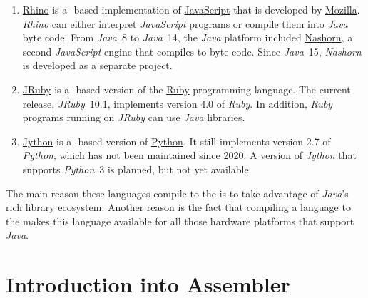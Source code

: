 \begin{enumerate}
      As of November 2026, \textsl{Clojure} occupies the $50^{\mathrm{th}}$ place in the
      \href{https://www.tiobe.com/tiobe-index/}{Tiobe index}.
\item \href{https://github.com/mozilla/rhino}{Rhino}
      is a -based implementation of
      \href{https://developer.mozilla.org/en-US/docs/Web/JavaScript}{JavaScript} that is developed by
      \href{https://www.mozilla.org}{Mozilla}.  \textsl{Rhino} can either interpret \textsl{JavaScript}
      programs or compile them into \textsl{Java} byte code.  From \textsl{Java}~8 to \textsl{Java}~14, the
      \textsl{Java} platform included \href{https://github.com/openjdk/nashorn}{Nashorn}, a second
      \textsl{JavaScript} engine that compiles to byte code.  Since \textsl{Java}~15, \textsl{Nashorn} is
      developed as a separate project.
\item \href{https://www.jruby.org}{JRuby}
      is a -based version of the \href{https://www.ruby-lang.org}{Ruby} programming language.
      The current release, \textsl{JRuby}~10.1, implements version 4.0 of \textsl{Ruby}.  In addition,
      \textsl{Ruby} programs running on \textsl{JRuby} can use \textsl{Java} libraries.
\item \href{https://www.jython.org}{Jython} 
      is a -based version of \href{https://www.python.org}{Python}.  It still implements
      version 2.7 of \textsl{Python}, which has not been maintained since 2020.  A version of \textsl{Jython}
      that supports \textsl{Python}~3 is planned, but not yet available.
\end{enumerate}
The main reason these languages compile to the  is to take advantage of \textsl{Java}'s rich library ecosystem.
Another reason is the fact that compiling a language to the  makes this language available for all those
hardware platforms that support \textsl{Java}.

\section{Introduction into \texorpdfstring{}{Pytunia} Assembler}

